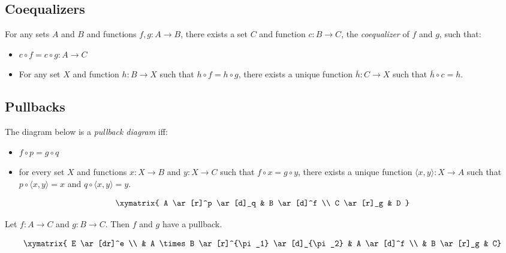 \subsection{Coequalizers}

\begin{ax}[Coequalizers]
  For any sets $A$ and $B$ and functions $f, g : A \rightarrow B$, there
  exists a set $C$ and function $c : B \rightarrow C$, the \emph{coequalizer}
  of $f$ and $g$, such that:
  \begin{itemize}
    \item $c \circ f = c \circ g : A \rightarrow C$
    \item For any set $X$ and function $h : B \rightarrow X$ such that $h
    \circ f
    = h \circ g$, there exists a unique function $\overline{h} : C
    \rightarrow
    X$
    such that $\overline{h} \circ c = h$.
  \end{itemize}
\end{ax}

\subsection{Pullbacks}

  \begin{df}[Pullback]
  The diagram below is a \emph{pullback diagram} iff:
  \begin{itemize}
    \item $f \circ p = g \circ q$
    \item for every set $X$ and
    functions $x : X \rightarrow B$ and $y : X \rightarrow C$ such that $f
    \circ x
    = g \circ y$, there exists a unique function $\langle x, y \rangle : X
    \rightarrow A$ such that $p \circ \langle x,y \rangle = x$ and $q \circ
    \langle
    x, y \rangle = y$.
  \end{itemize}
\[      \xymatrix{ A \ar[r]^p \ar[d]_q & B \ar[d]^f \\
      C \ar[r]_g & D } \]
\end{df}

   \begin{prop}
     \label{prop:sets:axioms:pullback}
 Let $f : A \rightarrow C$ and $g : B \rightarrow C$. Then $f$ and $g$ have a
 pullback.
\end{prop}

   \[ \xymatrix{
  E \ar[dr]^e \\
  & A \times B \ar[r]^{\pi_1} \ar[d]_{\pi_2} & A \ar[d]^f \\
  & B \ar[r]_g & C}
 \]

